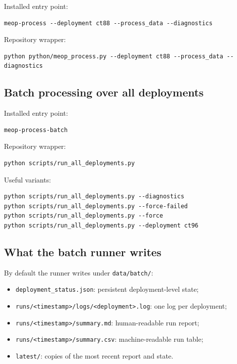 \documentclass[11pt,a4paper]{article}
\newcommand{\pkg}[1]{\texttt{#1}}
\begin{document}
Installed entry point:

\begin{lstlisting}[style=meopcode]
meop-process --deployment ct88 --process_data --diagnostics
\end{lstlisting}

Repository wrapper:

\begin{lstlisting}[style=meopcode]
python python/meop_process.py --deployment ct88 --process_data --diagnostics
\end{lstlisting}

\subsection{Batch processing over all deployments}

Installed entry point:

\begin{lstlisting}[style=meopcode]
meop-process-batch
\end{lstlisting}

Repository wrapper:

\begin{lstlisting}[style=meopcode]
python scripts/run_all_deployments.py
\end{lstlisting}

Useful variants:

\begin{lstlisting}[style=meopcode]
python scripts/run_all_deployments.py --diagnostics
python scripts/run_all_deployments.py --force-failed
python scripts/run_all_deployments.py --force
python scripts/run_all_deployments.py --deployment ct96
\end{lstlisting}

\subsection{What the batch runner writes}

By default the runner writes under \pkg{data/batch/}:

\begin{itemize}[leftmargin=1.5em]
  \item \pkg{deployment\_status.json}: persistent deployment-level state;
  \item \pkg{runs/<timestamp>/logs/<deployment>.log}: one log per deployment;
  \item \pkg{runs/<timestamp>/summary.md}: human-readable run report;
  \item \pkg{runs/<timestamp>/summary.csv}: machine-readable run table;
  \item \pkg{latest/}: copies of the most recent report and state.
\end{itemize}
\end{document}
